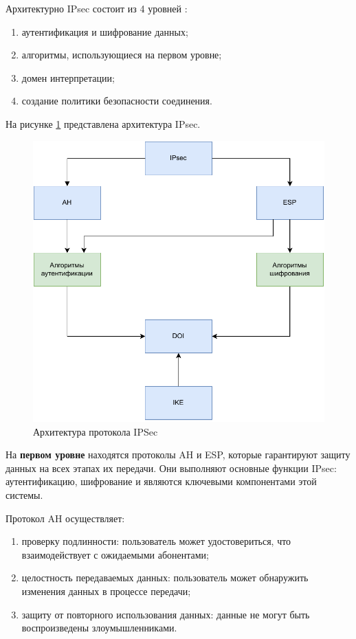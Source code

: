Архитектурно IPsec состоит из 4 уровней \cite{ipsec}:

\begin{enumerate}
	\item аутентификация и шифрование данных;
	\item алгоритмы, использующиеся на первом уровне;
	\item домен интерпретации;
	\item создание политики безопасности соединения.
\end{enumerate}

На рисунке \ref{fig:ipsec} представлена архитектура IPsec.

\begin{figure}[h!]
	\centering
	\includegraphics[width=\textwidth]{img/ipsec.pdf}
	\caption{Архитектура протокола IPSec}
	\label{fig:ipsec}
\end{figure}

На \textbf{первом уровне} находятся протоколы AH и ESP, которые гарантируют защиту данных на всех этапах их передачи. Они выполняют основные функции IPsec: аутентификацию, шифрование и являются ключевыми компонентами этой системы.

Протокол AH осуществляет:

\begin{enumerate}
	\item проверку подлинности: пользователь может удостовериться, что взаимодействует с ожидаемыми абонентами;
	\item целостность передаваемых данных: пользователь может обнаружить изменения данных в процессе передачи;
	\item защиту от повторного использования данных: данные не могут быть воспроизведены злоумышленниками.
\end{enumerate}

